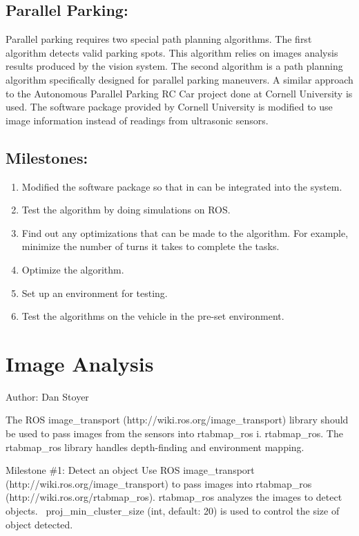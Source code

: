 \documentclass[compsoc,draftclsnofoot,onecolumn,10pt]{IEEEtran}
\begin{document}
\subsection{Parallel Parking:}
Parallel parking requires two special path planning algorithms. The first algorithm detects valid parking spots. This algorithm relies on images analysis results produced by the vision system. The second algorithm is a path planning algorithm specifically designed for parallel parking maneuvers. A similar approach to the Autonomous Parallel Parking RC Car project done at Cornell University is used. The software package provided by Cornell University is modified to use image information instead of readings from ultrasonic sensors.\par
\subsection{Milestones:}
\begin{enumerate}
	\item Modified the software package so that in can be integrated into the system.
	\item Test the algorithm by doing simulations on ROS.
	\item Find out any optimizations that can be made to the algorithm. For example, minimize the number of turns it takes to complete the tasks.
	\item Optimize the algorithm.
	\item Set up an environment for testing.
	\item Test the algorithms on the vehicle in the pre-set environment.
\end{enumerate}

\section{Image Analysis}
Author: Dan Stoyer\par
The ROS image\_transport (http://wiki.ros.org/image\_transport) library should
be used to pass images from the sensors into rtabmap\_ros i. rtabmap\_ros. The
rtabmap\_ros library handles depth-finding and environment mapping. 

Milestone \#1: Detect an object
Use ROS image\_transport (http://wiki.ros.org/image\_transport) to pass images
into rtabmap\_ros (http://wiki.ros.org/rtabmap\_ros). rtabmap\_ros analyzes
the images to detect objects. ~proj\_min\_cluster\_size (int, default: 20) is
used to control the size of object detected.
\end{document}
